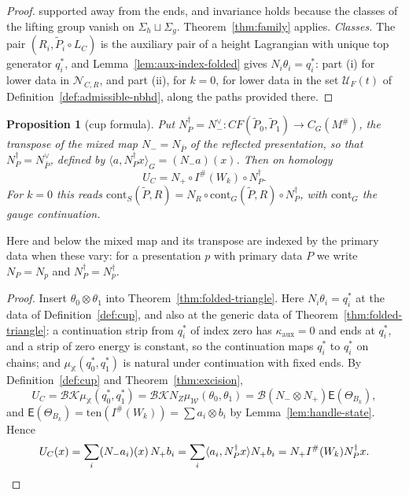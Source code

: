 \documentclass[11pt]{amsart}
\newtheorem{proposition}[theorem]{Proposition}
\theoremstyle{definition}
\theoremstyle{remark}
\theoremstyle{plain}
\numberwithin{equation}{section}
\newcommand{\Ish}{I^{\#}}
\newcommand{\CF}{\mathit{CF}}
\begin{document}
\begin{proof}
supported away from the ends, and invariance holds because the classes of the
lifting group vanish on $\Sigma_h\sqcup\Sigma_g$. Theorem~\ref{thm:family}
applies.
\emph{Classes.} The pair $(R_i,\widetilde P_i\circ L_C)$ is the auxiliary pair of a height Lagrangian with unique top generator $q_i^*$, and
Lemma~\ref{lem:aux-index-folded} gives $N_i\theta_i=q_i^*$: part (i) for lower data in
$\mathcal N_{C,R}$, and part (ii), for $k=0$, for lower data in the set $\mathcal U_F(t)$ of
Definition~\ref{def:admissible-nbhd}, along the paths provided there.
\end{proof}

\begin{proposition}[cup formula]\label{prop:cup-formula}
Put $N^\dagger_P=N_-^\vee\colon\CF(\widetilde P_0,\widetilde P_1)\to C_G(M^\#)$, the transpose of the mixed
map $N_-=N_{\bar P}$ of the reflected presentation, so that $N^\dagger_P=N_{\bar P}^\vee$, defined by
$\langle a,N^\dagger_Px\rangle_G=(N_-a)(x)$. Then on homology
\[
U_C=N_+\circ\Ish(W_k)\circ N^\dagger_P .
\]
For $k=0$ this reads $\mathrm{cont}_S(\widetilde P,R)=N_R\circ \mathrm{cont}_G(\widetilde P,R)\circ N^\dagger_P$,
with $\mathrm{cont}_G$ the gauge continuation.
\end{proposition}

Here and below the mixed map and its transpose are indexed by the primary data when these
vary: for a presentation $p$ with primary data $P$ we write $N_P=N_p$ and $N^\dagger_P=N^\dagger_p$.

\begin{proof}
Insert $\theta_0\otimes\theta_1$ into Theorem~\ref{thm:folded-triangle}. Here
$N_i\theta_i=q_i^*$ at the data of Definition~\ref{def:cup}, and also at the generic data
of Theorem~\ref{thm:folded-triangle}: a continuation strip from $q_i^*$ of index zero has
$\kappa_{\mathrm{aux}}=0$ and ends at $q_i^*$, and a strip of zero energy is constant, so
the continuation maps $q_i^*$ to $q_i^*$ on chains; and $\mu_{\mathbb X}(q_0^*,q_1^*)$ is natural
under continuation with fixed ends. By Definition~\ref{def:cup} and
Theorem~\ref{thm:excision},
\[
U_C=\mathcal B\mathcal K\mu_{\mathbb X}(q_0^*,q_1^*)=\mathcal B\mathcal K N_Z
\mu_{\mathscr W}(\theta_0,\theta_1)=\mathcal B(N_-\otimes N_+)\mathsf E(\Theta_{B_k}),
\]
and $\mathsf E(\Theta_{B_k})=\mathrm{ten}(\Ish(W_k))=\sum a_i\otimes b_i$ by
Lemma~\ref{lem:handle-state}. Hence
\[
U_C(x)=\sum_i(N_-a_i)(x)\,N_+b_i=\sum_i\langle a_i,N^\dagger_Px\rangle
N_+b_i=N_+\Ish(W_k)N^\dagger_Px. \qedhere
\]
\end{proof}
\end{document}
